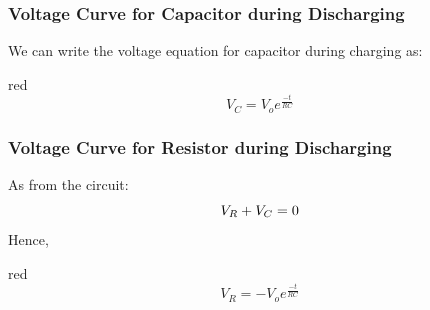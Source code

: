\subsubsection{Voltage Curve for Capacitor during Discharging}
We can write the voltage equation for capacitor during charging as:
\begin{mybox}{red}{}
  \begin{equation}\label{eq:11.93}
    V_{C} = V_{o}e^{\frac{-t}{RC}}
  \end{equation}
\end{mybox}
\subsubsection{Voltage Curve for Resistor during Discharging}
As from the circuit:
\begin{equation}\notag
  V_{R} + V_{C} = 0
\end{equation}
Hence,
\begin{mybox}{red}{}
  \begin{equation}\label{eq:11.94}
    V_{R} = -V_{o}e^{\frac{-t}{RC}}
  \end{equation}
\end{mybox}
